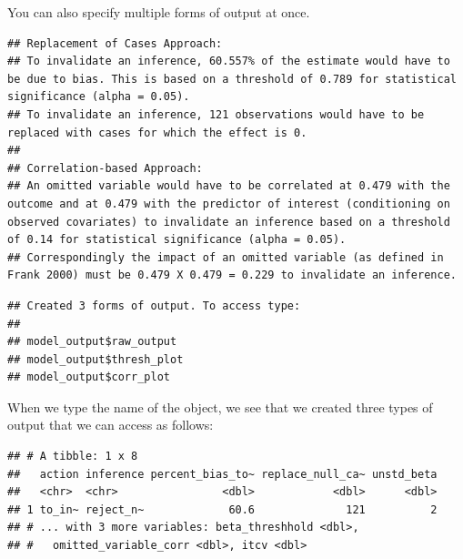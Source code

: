 \documentclass[man]{apa6}
\theoremstyle{definition}
\theoremstyle{definition}
\theoremstyle{definition}
\theoremstyle{remark}
\begin{document}
You can also specify multiple forms of output at once.

\begin{verbatim}
## Replacement of Cases Approach:
## To invalidate an inference, 60.557% of the estimate would have to be due to bias. This is based on a threshold of 0.789 for statistical significance (alpha = 0.05).
## To invalidate an inference, 121 observations would have to be replaced with cases for which the effect is 0.
## 
## Correlation-based Approach:
## An omitted variable would have to be correlated at 0.479 with the outcome and at 0.479 with the predictor of interest (conditioning on observed covariates) to invalidate an inference based on a threshold of 0.14 for statistical significance (alpha = 0.05).
## Correspondingly the impact of an omitted variable (as defined in Frank 2000) must be 0.479 X 0.479 = 0.229 to invalidate an inference.
\end{verbatim}

\begin{verbatim}
## Created 3 forms of output. To access type: 
## 
## model_output$raw_output
## model_output$thresh_plot
## model_output$corr_plot
\end{verbatim}

When we type the name of the object, we see that we created three types
of output that we can access as follows:

\begin{verbatim}
## # A tibble: 1 x 8
##   action inference percent_bias_to~ replace_null_ca~ unstd_beta
##   <chr>  <chr>                <dbl>            <dbl>      <dbl>
## 1 to_in~ reject_n~             60.6              121          2
## # ... with 3 more variables: beta_threshhold <dbl>,
## #   omitted_variable_corr <dbl>, itcv <dbl>
\end{verbatim}
\end{document}
